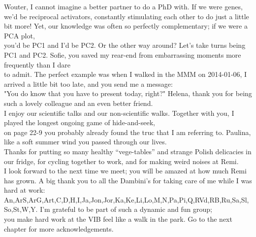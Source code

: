 Wouter, I cannot imagine a better partner to do a PhD with. If we were genes,\\we'd be reciprocal activators, constantly stimulating each other to do just a little bit more!
Yet, our knowledge was often so perfectly complementary; if we were a PCA plot,\\you'd be PC1 and I'd be PC2. Or the other way around? Let's take turns being PC1 and PC2.
Sofie, you saved my rear-end from embarrassing moments more frequently than I dare\\ to admit. The perfect example was when I walked in the MMM on 2014-01-06,
I arrived a little bit too late, and you send me a message:\\"You do know that you have to present today, right?"
Helena, thank you for being such a lovely colleague and an even better friend.\\I enjoy our scientific talks and our non-scientific walks.
Together with you, I played the longest ongoing game of hide-and-seek,\\on page 22-9 you probably already found the truc that I am referring to.
Paulina, like a soft summer wind you passed through our lives.\\Thanks for putting so many healthy “vege-tables” and strange Polish delicacies in our fridge,
for cycling together to work, and for making weird noises at Remi.\\I look forward to the next time we meet; you will be amazed at how much Remi has grown.
A big thank you to all the Dambini's for taking care of me while I was hard at work:\\An,ArS,ArG,Art,C,D,H,I,Ja,Jon,Jor,Ka,Ke,Li,Lo,M,N,Pa,Pi,Q,RVd,RB,Ru,Sa,Sl,So,St,W,Y.
I'm grateful to be part of such a dynamic and fun group;\\you make hard work at the VIB feel like a walk in the park.
Go to the next chapter for more acknowledgements.

